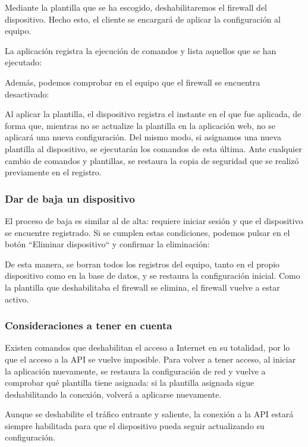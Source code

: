 Mediante la plantilla que se ha escogido, deshabilitaremos el firewall del dispositivo.
Hecho esto, el cliente se encargará de aplicar la configuración al equipo.

La aplicación registra la ejecución de comandos y lista aquellos que se han ejecutado:


Además, podemos comprobar en el equipo que el firewall se encuentra desactivado:


Al aplicar la plantilla, el dispositivo registra el instante en el que fue aplicada, de forma que, mientras no se actualize la plantilla
en la aplicación web, no se aplicará una nueva configuración.
Del mismo modo, si asignamos una nueva plantilla al dispositivo, se ejecutarán los comandos de esta última.
Ante cualquier cambio de comandos y plantillas, se restaura la copia de seguridad que se realizó previamente en el
registro.

\subsubsection{Dar de baja un dispositivo}

El proceso de baja es similar al de alta: requiere iniciar sesión y que el dispositivo se encuentre registrado.
Si se cumplen estas condiciones, podemos pulsar en el botón ``Eliminar dispositivo`` y confirmar la eliminación:


De esta manera, se borran todos los registros del equipo, tanto en el propio dispositivo como en la base de datos, y
se restaura la configuración inicial.
Como la plantilla que deshabilitaba el firewall se elimina, el firewall vuelve a estar activo.

\subsubsection{Consideraciones a tener en cuenta}

Existen comandos que deshabilitan el acceso a Internet en su totalidad, por lo que el acceso a la API se vuelve imposible.
Para volver a tener acceso, al iniciar la aplicación nuevamente, se restaura la configuración de red y vuelve
a comprobar qué plantilla tiene asignada: si la plantilla asignada sigue deshabilitando la conexión, volverá a aplicarse
nuevamente.

Aunque se deshabilite el tráfico entrante y saliente, la conexión a la API estará siempre habilitada para
que el dispositivo pueda seguir actualizando su configuración.